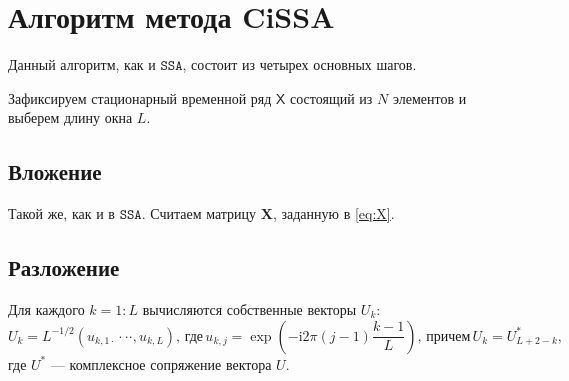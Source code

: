 \documentclass[12pt, specialist, subf
]{disser}
\theoremstyle{definition}
\newcommand{\SSA}{\texttt{SSA}}
\newcommand{\TS}{\mathsf{X}}
\newtheorem{definition}{Определение} %
\begin{document}

\section{Алгоритм метода CiSSA}

Данный алгоритм, как и $\SSA$, состоит из четырех основных шагов.

Зафиксируем стационарный временной ряд $\TS$ состоящий из $N$ элементов и выберем длину окна $L$.
\subsection*{Вложение}
Такой же, как и в $\SSA$. Считаем матрицу $\mathbf{X}$, заданную в \eqref{eq:X}.

\subsection*{Разложение}

Для каждого $k = 1:L$ вычисляются собственные векторы ${U}_{k}$:
\begin{equation*}
	{U}_{k}=L^{-1/2}(u_{k,1\cdot}\cdot\cdot\cdot,u_{k,L}), \, \text{где} \,
	u_{k,j}=\exp\left(-\mathrm{i}2\pi(j-1)\frac{k-1}{L}\right), \,
	\text{причем} \, U_{k} = U_{L+2-k}^*,
\end{equation*}
где $U^*$ --- комплексное сопряжение вектора $U$.
\end{document}
